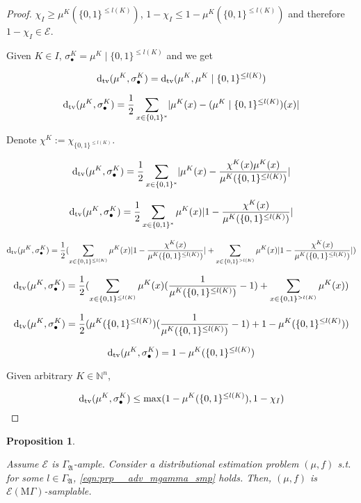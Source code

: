 \documentclass{article}
\numberwithin{equation}{section}
\theoremstyle{definition}
\theoremstyle{plain}
\newtheorem{proposition}{Proposition}[section]
\newcommand{\Bool}{\{0,1\}}
\newcommand{\Words}{{\Bool^*}}
\newcommand{\WordsLen}[1]{{\Bool^{#1}}}
\newcommand{\Dtv}{\operatorname{d}_{\textnormal{tv}}}
\newcommand{\Nats}{\mathbb{N}}
\newcommand{\Abs}[1]{\lvert #1 \rvert}
\newcommand{\GrowA}{\Gamma_{\mathfrak{A}}}
\newcommand{\MGrow}{\mathrm{M}\Gamma}
\newcommand{\Fall}{\mathcal{E}}
\newcommand{\EMG}{\Fall(\MGrow)}
\begin{document}
\begin{proof}

$\chi_I \geq \mu^{K}(\Bool^{\leq l(K)})$, $1 - \chi_{I} \leq 1 - \mu^{K}(\Bool^{\leq l(K)})$ and therefore $1 - \chi_I \in \Fall$.

Given $K \in I$, ${\sigma_\bullet^K = \mu^{K} \mid \Bool^{\leq l(K)}}$ and we get

$$\Dtv(\mu^{K}, \sigma_\bullet^K) = \Dtv(\mu^{K}, \mu^{K} \mid \Bool^{\leq l(K)})$$

$$\Dtv(\mu^{K}, \sigma_\bullet^K) = \frac{1}{2} \sum_{x \in \Words} \Abs{\mu^{K}(x)-(\mu^{K} \mid \WordsLen{\leq l(K)})(x)}$$

Denote $\chi^K:=\chi_{\WordsLen{\leq l(K)}}$.

$$\Dtv(\mu^{K}, \sigma_\bullet^K) = \frac{1}{2} \sum_{x \in \Words} \Abs{\mu^{K}(x)-\frac{\chi^K(x)\mu^{K}(x)}{\mu^{K}(\WordsLen{\leq l(K)})}}$$

$$\Dtv(\mu^{K}, \sigma_\bullet^K) = \frac{1}{2} \sum_{x \in \Words} \mu^{K}(x) \Abs{1-\frac{\chi^K(x)}{\mu^{K}(\Bool^{\leq l(K)})}}$$

$$\Dtv(\mu^{K}, \sigma_\bullet^K) = \frac{1}{2} (\sum_{x \in \Bool^{\leq l(K)}} \mu^{K}(x) \Abs{1-\frac{\chi^K(x)}{\mu^{K}(\Bool^{\leq l(K)})}}+\sum_{x \in \Bool^{>l(K)}} \mu^{K}(x) \Abs{1-\frac{\chi^K(x)}{\mu^{K}(\Bool^{\leq l(K)})}})$$

$$\Dtv(\mu^{K}, \sigma_\bullet^K) = \frac{1}{2} (\sum_{x \in \Bool^{\leq l(K)}} \mu^{K}(x)(\frac{1}{\mu^{K}(\Bool^{\leq l(K)})}-1)+\sum_{x \in \Bool^{>l(K)}} \mu^{K}(x))$$

$$\Dtv(\mu^{K}, \sigma_\bullet^K) = \frac{1}{2} (\mu^{K}(\Bool^{\leq l(K)})(\frac{1}{\mu^{K}(\Bool^{\leq l(K)})}-1)+1 - \mu^{K}(\Bool^{\leq l(K)}))$$

$$\Dtv(\mu^{K}, \sigma_\bullet^K) = 1-\mu^{K}(\Bool^{\leq l(K)})$$

Given arbitrary $K \in \Nats^n$,

$$\Dtv(\mu^{K}, \sigma_\bullet^K) \leq \max(1-\mu^{K}(\Bool^{\leq l(K)}), 1-\chi_I)$$
\end{proof}

\begin{samepage}
\begin{proposition}
\label{prp:adv_mgamma_gen}

Assume $\Fall$ is $\GrowA$-ample. Consider a distributional estimation problem $(\mu,f)$ s.t. for some $l \in \GrowA$, \ref{eqn:prp__adv_mgamma_smp} holds. Then, $(\mu,f)$ is $\EMG$-samplable. 

\end{proposition}
\end{samepage}
\end{document}

